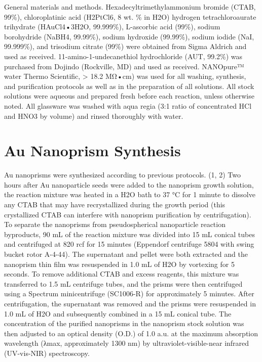 \documentclass [11pt, proquest] {uwthesis}[2016/11/22]
\begin{document}
General materials and methods. Hexadecyltrimethylammonium bromide (CTAB, 99\%), chloroplatinic acid (H2PtCl6, 8 wt. \% in H2O) hydrogen tetrachloroaurate trihydrate (HAuCl4•3H2O, 99.999\%), L-ascorbic acid (99\%), sodium borohydride (NaBH4, 99.99\%), sodium hydroxide (99.99\%), sodium iodide (NaI, 99.999\%), and trisodium citrate (99\%) were obtained from Sigma Aldrich and used as received. 11-amino-1-undecanethiol hydrochloride (AUT, 99.2\%) was purchased from Dojindo (Rockville, MD) and used as received. NANOpure™ water Thermo Scientific, > 18.2 MΩ•cm) was used for all washing, synthesis, and purification protocols as well as in the preparation of all solutions. All stock solutions were aqueous and prepared fresh before each reaction, unless otherwise noted. All glassware was washed with aqua regia (3:1 ratio of concentrated HCl and HNO3 by volume) and rinsed thoroughly with water.

\section{Au Nanoprism Synthesis}

Au nanoprisms were synthesized according to previous protocols. (1, 2) Two hours after Au nanoparticle seeds were added to the nanoprism growth solution, the reaction mixture was heated in a H2O bath to 37 °C for 1 minute to dissolve any CTAB that may have recrystallized during the growth period (this crystallized CTAB can interfere with nanoprism purification by centrifugation). To separate the nanoprisms from pseudospherical nanoparticle reaction byproducts, 90 mL of the reaction mixture was divided into 15 mL conical tubes and
centrifuged at 820 rcf for 15 minutes (Eppendorf centrifuge 5804 with swing bucket rotor A-4-44). The supernatant and pellet were both extracted and the nanoprism thin film was resuspended in 1.0 mL of H2O by vortexing for 5 seconds. To remove additional CTAB and excess reagents, this mixture was transferred to 1.5 mL centrifuge tubes, and the prisms were then centrifuged using a Spectrum minicentrifuge (SC1006-R) for approximately 5 minutes. After centrifugation, the supernatant was removed and the prisms were resuspended in 1.0 mL of H2O and subsequently combined in a 15 mL conical tube. The concentration of the purified nanoprisms in the nanoprism stock solution was then adjusted to an optical density (O.D.) of 1.0 a.u. at the maximum absorption wavelength (λmax, approximately 1300 nm) by ultraviolet-visible-near infrared (UV-vis-NIR) spectroscopy.
\end{document}
